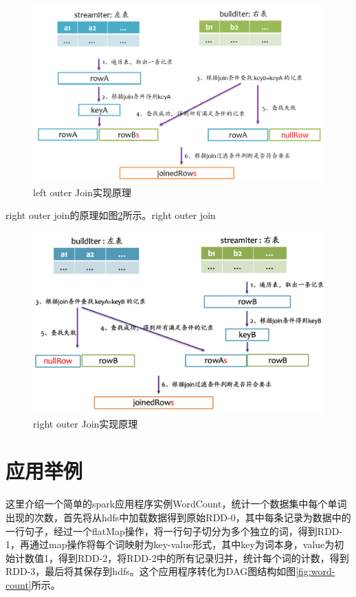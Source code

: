 \begin{figure}
    \centering
    \includegraphics[width=1\textwidth]{Img/spark-sql-leftouter-join.png}
    \caption{left outer Join实现原理}
    \label{fig:leftouter-join}
\end{figure}

right outer join的原理如图\ref{fig:rightouter-join}所示。right outer join

\begin{figure}
    \centering
    \includegraphics[width=1\textwidth]{Img/spark-sql-rightouter-join.png}
    \caption{right outer Join实现原理}
    \label{fig:rightouter-join}
\end{figure}


\section{应用举例}

这里介绍一个简单的spark应用程序实例WordCount，统计一个数据集中每个单词出现的次数，首先将从hdfs中加载数据得到原始RDD-0，其中每条记录为数据中的一行句子，经过一个flatMap操作，将一行句子切分为多个独立的词，得到RDD-1，再通过map操作将每个词映射为key-value形式，其中key为词本身，value为初始计数值1，得到RDD-2，将RDD-2中的所有记录归并，统计每个词的计数，得到RDD-3，最后将其保存到hdfs。这个应用程序转化为DAG图结构如图\ref{fig:word-count}所示。

